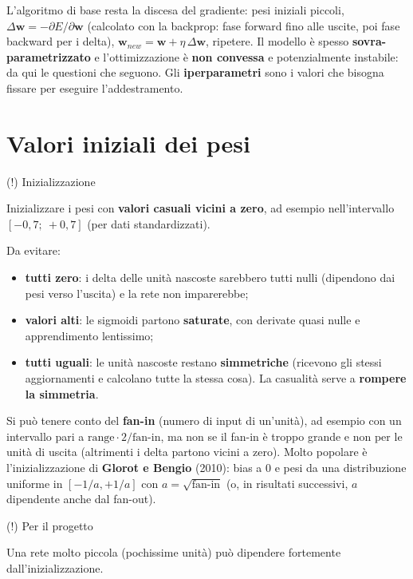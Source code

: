 L'algoritmo di base resta la discesa del gradiente: pesi iniziali
piccoli, \(\Delta\mathbf{w} = -\partial E/\partial\mathbf{w}\)
(calcolato con la backprop: fase forward fino alle uscite, poi fase
backward per i delta),
\(\mathbf{w}_{new} = \mathbf{w} + \eta\,\Delta\mathbf{w}\), ripetere. Il
modello è spesso \textbf{sovra-parametrizzato} e l'ottimizzazione è
\textbf{non convessa} e potenzialmente instabile: da qui le questioni
che seguono. Gli \textbf{iperparametri} sono i valori che bisogna
fissare per eseguire l'addestramento.

\section{Valori iniziali dei pesi}\label{valori-iniziali-dei-pesi}

\begin{boxtip}{(!) Inizializzazione}

Inizializzare i pesi con \textbf{valori casuali vicini a zero}, ad
esempio nell'intervallo \([-0{,}7;\ +0{,}7]\) (per dati standardizzati).

\end{boxtip}

Da evitare:

\begin{itemize}
\tightlist
\item
  \textbf{tutti zero}: i delta delle unità nascoste sarebbero tutti
  nulli (dipendono dai pesi verso l'uscita) e la rete non imparerebbe;
\item
  \textbf{valori alti}: le sigmoidi partono \textbf{saturate}, con
  derivate quasi nulle e apprendimento lentissimo;
\item
  \textbf{tutti uguali}: le unità nascoste restano \textbf{simmetriche}
  (ricevono gli stessi aggiornamenti e calcolano tutte la stessa cosa).
  La casualità serve a \textbf{rompere la simmetria}.
\end{itemize}

Si può tenere conto del \textbf{fan-in} (numero di input di un'unità),
ad esempio con un intervallo pari a
\(\text{range}\cdot 2/\text{fan-in}\), ma non se il fan-in è troppo
grande e non per le unità di uscita (altrimenti i delta partono vicini a
zero). Molto popolare è l'inizializzazione di \textbf{Glorot e Bengio}
(2010): bias a 0 e pesi da una distribuzione uniforme in
\([-1/a, +1/a]\) con \(a = \sqrt{\text{fan-in}}\) (o, in risultati
successivi, \(a\) dipendente anche dal fan-out).

\begin{boxnote}{(!) Per il progetto}

Una rete molto piccola (pochissime unità) può dipendere fortemente
dall'inizializzazione.

\end{boxnote}

